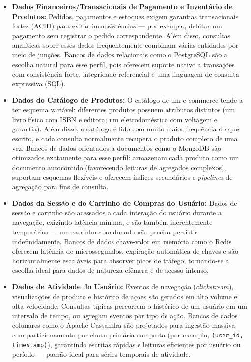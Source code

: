 \begin{itemize}
  \item \textbf{Dados Financeiros/Transacionais de Pagamento e Inventário de Produtos:}
  Pedidos, pagamentos e estoques exigem garantias transacionais fortes (ACID) para evitar
  inconsistências --- por exemplo, debitar um pagamento sem registrar o pedido
  correspondente. Além disso, consultas analíticas sobre esses dados frequentemente
  combinam várias entidades por meio de junções. Bancos de dados relacionais como o
  PostgreSQL são a escolha natural para esse perfil, pois oferecem suporte nativo a
  transações com consistência forte, integridade referencial e uma linguagem de consulta
  expressiva (SQL).

  \item \textbf{Dados do Catálogo de Produtos:} O catálogo de um e-commerce tende a ter
  esquema variável: diferentes produtos possuem atributos distintos (um livro físico com
  ISBN e editora; um eletrodoméstico com voltagem e garantia). Além disso, o catálogo é
  lido com muito maior frequência do que escrito, e cada consulta normalmente recupera o
  produto completo de uma vez. Bancos de dados orientados a documentos como o MongoDB são
  otimizados exatamente para esse perfil: armazenam cada produto como um documento
  autocontido (favorecendo leituras de agregados complexos), suportam esquemas flexíveis e
  oferecem índices secundários e \textit{pipelines} de agregação para fins de consulta.

  \item \textbf{Dados da Sessão e do Carrinho de Compras do Usuário:} Dados de sessão e
  carrinho são acessados a cada interação do usuário durante a navegação, exigindo latência
  mínima, e são também inerentemente temporários --- um carrinho abandonado não precisa
  persistir indefinidamente. Bancos de dados chave-valor em memória como o Redis oferecem
  latência de microssegundos, expiração automática de chaves e são horizontalmente
  escaláveis para absorver picos de tráfego, tornando-se a escolha ideal para dados de
  natureza efêmera e de acesso intenso.

  \item \textbf{Dados de Atividade do Usuário:} Eventos de navegação
  (\textit{clickstream}), visualizações de produto e histórico de ações são gerados em alto
  volume e alta velocidade. Consultas típicas percorrem o histórico de um usuário em um
  intervalo de tempo, ou agregam eventos por tipo de ação. Bancos de dados colunares como o
  Apache Cassandra são projetados para ingestão massiva com particionamento por chave
  primária composta (por exemplo, \texttt{(user\_id, timestamp)}), garantindo escritas
  rápidas e leituras eficientes por usuário ou período --- padrão ideal para séries
  temporais de atividade.


\end{itemize}
